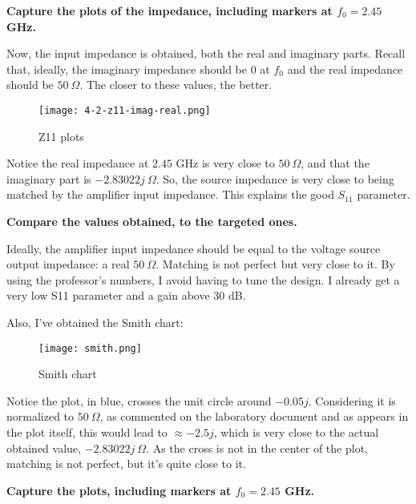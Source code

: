 \begin{pexbox}{}
   \noindent \textbf{Capture the plots of the impedance, including markers at $f_0 = 2.45$ GHz.}
\end{pexbox}
   
   \noindent Now, the input impedance is obtained, both the real and imaginary parts. Recall that, ideally, the imaginary impedance should be $0$ at $f_0$ and the real impedance should be $50 \ \Omega$. The closer to these values, the better.
\begin{figure} [H] \centering
   \texttt{[image: 4-2-z11-imag-real.png]}
   \caption{Z11 plots}
\end{figure}

\noindent Notice the real impedance at $2.45$ GHz is very close to $50 \ \Omega$, and that the imaginary part is $-2.83022 j \ \Omega$. So, the source impedance is very close to being matched by the amplifier input impedance. This explains the good $S_{11}$ parameter.


\begin{pexbox}{}
   \noindent \textbf{Compare the values obtained, to the targeted ones.}
\end{pexbox}

   \noindent Ideally, the amplifier input impedance should be equal to the voltage source output impedance: a real $50 \ \Omega$. Matching is not perfect but very close to it. By using the professor's numbers, I avoid having to tune the design. I already get a very low S11 parameter and a gain above $30$ dB.


\noindent Also, I've obtained the Smith chart:
\begin{figure} [H] \centering
   \texttt{[image: smith.png]}
   \caption{Smith chart}
\end{figure}

\noindent Notice the plot, in blue, crosses the unit circle around $-0.05 j$. Considering it is normalized to $50 \ \Omega$, as commented on the laboratory document and as appears in the plot itself, this would lead to $\approx -2.5j$, which is very close to the actual obtained value, $-2.83022 j \ \Omega$. As the cross is not in the center of the plot, matching is not perfect, but it's quite close to it.



\begin{pexbox}{}
   \noindent \textbf{Capture the plots, including markers at $f_0 = 2.45$ GHz.}
\end{pexbox}

